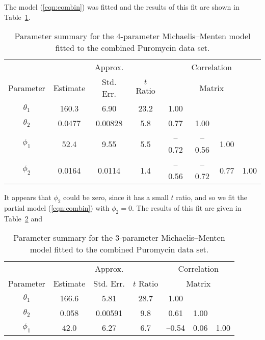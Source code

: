 \begin{example}
  The model (\ref{eqn:combin}) was fitted and the results of this fit are
  shown in Table~\ref{tbl:treloar3}.
  \begin{table}
    \caption{
      Parameter summary for the 4-parameter Michaelis--Menten model fitted
      to the combined Puromycin data set.
    }\label{tbl:treloar3}
    \begin{center}
      \begin{tabular}{cccccccc} \hline
        & &\multicolumn{1}{c}{Approx.}&&\multicolumn{4}{c}{Correlation}\\
        \multicolumn{1}{c}{Parameter} &\multicolumn{1}{c}{Estimate}& \multicolumn{1}{c}{Std. Err.}&\multicolumn{1}{c}{$t$ Ratio} &\multicolumn{4}{c}{Matrix}\\ \hline
        $\theta_{1}$ &160.3 & 6.90 & 23.2 &1.00\\
        $\theta_{2}$ & 0.0477 & 0.00828 & 5.8 & 0.77 & 1.00\\
        $\phi_{1}$ & 52.4 & 9.55 & 5.5 &--\/0.72 & --\/0.56 & 1.00\\
        $\phi_{2}$ & 0.0164 & 0.0114 &1.4 &--\/0.56 & --\/0.72 & 0.77 & 1.00\\ \hline
      \end{tabular}
    \end{center}
  \end{table}
  It appears that $\phi_{2}$ could be zero, since it has a small
  $t$ ratio, and so we fit the
  partial model (\ref{eqn:combin}) with $\phi_2 = 0$.
  The results of this fit are given in
  Table~\ref{tbl:treloar4} and
  \begin{table}
    \caption{
      Parameter summary for the 3-parameter Michaelis--Menten model fitted
      to the combined Puromycin data set.
    }\label{tbl:treloar4}
    \begin{center}
      \begin{tabular}{ccccccc}\hline
        & & \multicolumn{1}{c}{Approx.}&&\multicolumn{3}{c}{Correlation}\\
        \multicolumn{1}{c}{Parameter} &\multicolumn{1}{c}{Estimate}& \multicolumn{1}{c}{Std. Err.} &\multicolumn{1}{c}{$t$ Ratio} & \multicolumn{3}{c}{Matrix}\\ \hline
        $\theta_{1}$&166.6&5.81&28.7&1.00\\
        $\theta_{2}$&0.058&0.00591&9.8&0.61&1.00\\
        $\phi_{1}$&42.0&6.27&6.7&--\/0.54&0.06&1.00\\ \hline
      \end{tabular}

\end{center}
\end{table}
\end{example}
